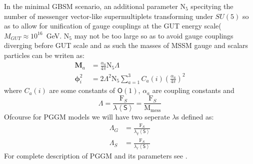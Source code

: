 {%
In the minimal GBSM scenario, an additional parameter  $\mathrm{N_{5}}$ specitying the number of messenger vector-like supermultiplets transforming under $SU(5)$ so as to allow for unification of gauge couplings at the GUT energy scale($M_{GUT} \approx 10^{16}$~GeV. $\mathrm{N_{5}}$ may not be too large so as to avoid gauge couplings diverging before GUT scale and as such the masses of MSSM gauge and scalars particles can be writen as:
\begin{align}\label{MSSMMasses}
\mathbf{M}_{a} &= \frac{\alpha_{a}}{4\pi}\mathrm{N_{5}}\Lambda \\ 
\mathbf{\phi}^{2}_{i} &= 2\Lambda^{2}\mathrm{N_{5}}\sum_{a=1}^{3}C_{a}(i) ( \frac{\alpha_{a}}{4\pi})^{2}
\end{align}
where $C_{a}(i)$ are some constants of $\mathsf{O}(1)$, $\alpha_{a}$ are coupling constants and 
\begin{equation}\label{Lambda}
\Lambda = \frac{\mathrm{F}_{S}}{\lambda \left\langle \mathsf{S} \right\rangle } = \frac{\mathrm{F}_{S}}{\mathrm{M}_{\mbox{mess}}}
\end{equation} 
Ofcourse for PGGM models we will have two seperate $\lambda$s defined as:
\begin{align}\label{Lambdap}
\Lambda_{G} &= \frac{\mathrm{F}_{S}}{\lambda_{q} \left\langle \mathsf{S} \right\rangle } \\
\Lambda_{S} &= \frac{\mathrm{F}_{S}}{\lambda_{\ell} \left\langle \mathsf{S} \right\rangle } 
\end{align}
For complete description of PGGM and its parameters see \cite{khoze}.
}
